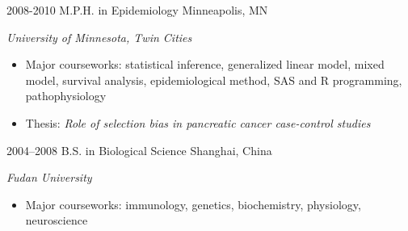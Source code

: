 \begin{entrylist}
  \entry
    {2008-2010}
    {M.P.H. in Epidemiology}
    {Minneapolis, MN}
    {
      \textit{University of Minnesota, Twin Cities}
      \begin{itemize}
        \item Major courseworks: statistical inference, generalized linear model, mixed model, survival analysis, epidemiological method, SAS and R programming, pathophysiology
        \item Thesis: \textit{Role of selection bias in pancreatic cancer case-control studies}
      \end{itemize}
    }
  \entry
    {2004–2008}
    {B.S. in Biological Science}
    {Shanghai, China}
    {
      \textit{Fudan University}
      \begin{itemize}
        \item Major courseworks: immunology, genetics, biochemistry, physiology, neuroscience
      \end{itemize}
    }
\end{entrylist}
